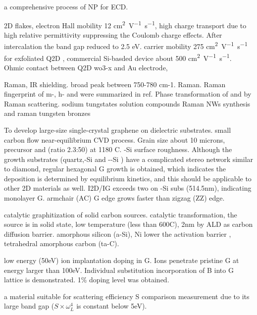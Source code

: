 a comprehensive process of  NP for ECD. \cite{Wojcik2014}

2D  flakes, electron Hall mobility 12 \si{cm^2V^{-1}s^{-1}}, high charge transport due to high relative permittivity suppressing the Coulomb charge effects. \cite{Zhuiykov2014} After  intercalation the band gap reduced to 2.5 eV. carrier mobility 275 \si{cm^2V^{-1}s^{-1}} for exfoliated Q2D , commercial Si-basded device about 500 \si{cm^2V^{-1}s^{-1}}. Ohmic contact between Q2D wo3-x and Au electrode, 

\cite{Hutter2014}

 Raman, IR shielding.\cite{Guo2012} \cite{Guo2011}
broad peak between 750-780 cm-1.
 Raman. \cite{Knee1979}
Raman fingerprint of m-, h- and  were summarized in ref\cite{Daniel1987}.
Phase transformation of  and  by Raman scattering. \cite{Lima2011}
sodium tungstates solution compounds Raman \cite{Redkin2010}
 NWs synthesis and raman \cite{Ma2005}
tungsten bronzes \cite{Wiseman1976}



To develop large-size single-crystal graphene on dielectric substrates. small carbon flow near-equilibrium CVD process. Grain size about 10 microns, precursor  and  (ratio 2.3:50) at 1180 C. -Si surface roughness. Although the growth substrates (quartz,-Si and --Si ) have a complicated stereo network similar to diamond, regular hexagonal G growth is obtained, which indicates the deposition is determined by equilibrium kinetics, and this should be applicable to other 2D materials as well. I2D/IG exceeds two on -Si subs (514.5nm), indicating monolayer G. armchair (AC) G edge grows faster than zigzag (ZZ) edge.\cite{Chen2013j}

catalytic graphitization of solid carbon sources. catalytic transformation, the source is in solid state, low temperature (less than 600C), 2nm   by ALD as carbon diffusion barrier. amorphous silicon (a-Si), Ni lower the activation barrier ,  tetrahedral amorphous carbon (ta-C).\cite{Weatherup2013}

low energy (50eV) ion implantation doping in G. Ions penetrate pristine G at energy larger than 100eV. Individual substitution incorporation of B into G lattice is demonstrated. 1\% doping level was obtained. \cite{Bangert2013}

 a material suitable for scattering efficiency S comparison measurement due to its large band gap ($S\times \omega_L^4$ is constant below 5eV).

